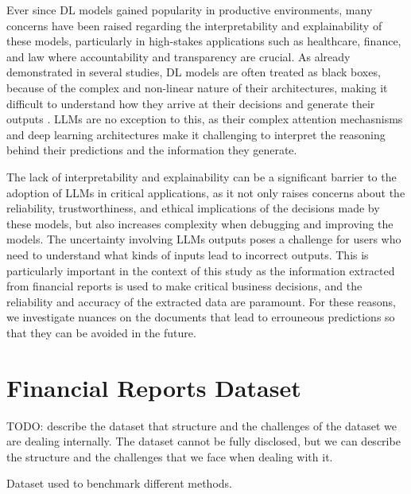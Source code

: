 \documentclass[english, 12pt, a4paper, elec, utf8, a-2b, online]{aaltothesis}
\begin{document}
Ever since \ac{DL} models gained popularity in productive environments, many concerns have been raised regarding the interpretability and explainability of these models, particularly in high-stakes applications such as healthcare, finance, and law where accountability and transparency are crucial.
As already demonstrated in several studies, \ac{DL} models are often treated as black boxes, because of the complex and non-linear nature of their architectures, making it difficult to understand how they arrive at their decisions and generate their outputs \cite{castelvecchi2016can, 2018_survey_explaining_black_box}.
\ac{LLM}s are no exception to this, as their complex attention mechasnisms and deep learning architectures make it challenging to interpret the reasoning behind their predictions and the information they generate.

The lack of interpretability and explainability can be a significant barrier to the adoption of \ac{LLM}s in critical applications, as it not only raises concerns about the reliability, trustworthiness, and ethical implications of the decisions made by these models, but also increases complexity when debugging and improving the models.
The uncertainty involving \ac{LLM}s outputs poses a challenge for users who need to understand what kinds of inputs lead to incorrect outputs.
This is particularly important in the context of this study as the information extracted from financial reports is used to make critical business decisions, and the reliability and accuracy of the extracted data are paramount.
For these reasons, we investigate nuances on the documents that lead to errouneous predictions so that they can be avoided in the future.

\clearpage

\section{Financial Reports Dataset}

TODO: describe the dataset that structure and the challenges of the dataset we are dealing internally. The dataset cannot be fully disclosed, but we can describe the structure and the challenges that we face when dealing with it.

Dataset used to benchmark different methods.
\end{document}

